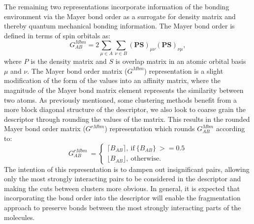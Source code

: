 The remaining two representations incorporate information of the bonding environment via the Mayer bond order as a surrogate for density matrix and thereby quantum mechanical bonding information.
The Mayer bond order is defined in terms of spin orbitals as:
\begin{equation}
G^{Mbm}_{A B} = 2 \sum_{\mu \in A} \sum_{\nu \in B} (\mathbf{P S})_{\mu \nu}(\mathbf{P S})_{\nu \mu},
\end{equation}
where $P$ is the density matrix and $S$ is overlap matrix in an atomic orbital basis $\mu$ and $\nu$.\autocite{10.1002/jcc} 
The Mayer bond order matrix ($G^{Mbm}$) representation is  a slight modification of the form of the values into an affinity matrix, where the magnitude of the Mayer bond matrix element represents the similarity between two atoms.
As previously mentioned, some clustering methods benefit from a more block diagonal structure of the descriptor, we also look to coarse grain the descriptor through rounding the values of the matrix. This results in the rounded Mayer bond order matrix ($G^{rMbm}$) representation which rounds $G^{Mbm}_{AB}$ according to:
\begin{equation}\label{eq:rmbm}
G^{rMbm}_{AB}\ = \begin{cases} \lceil B_{AB} \rceil, \ \text{if}\ \{B_{AB}\}\ >=0.5 \\ 
 \lfloor  B_{AB} \rfloor, \ \text{otherwise.} \end{cases}
\end{equation}
The intention of this representation is to dampen out insignificant pairs, allowing only the most strongly interacting pairs to be considered in the descriptor and making the cuts between clusters more obvious.
In general, it is expected that incorporating the bond order into the descriptor will enable the fragmentation approach to preserve bonds between the most strongly interacting parts of the molecules. 
 
